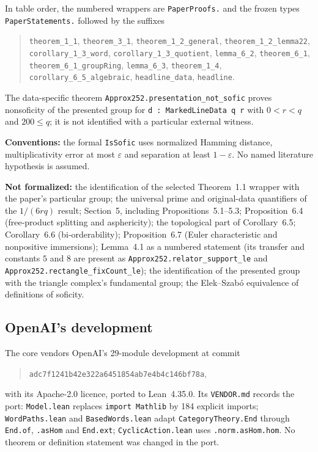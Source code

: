 \documentclass[11pt]{article}
\theoremstyle{definition}
\theoremstyle{remark}
\numberwithin{equation}{section}
\newcommand{\eps}{\varepsilon}
\newcommand{\lean}[1]{\nolinkurl{#1}}
\begin{document}
In table order, the numbered wrappers are \lean{PaperProofs.} and the frozen
types \lean{PaperStatements.} followed by the suffixes
\begin{quote}\small\raggedright
\lean{theorem_1_1}, \lean{theorem_3_1}, \lean{theorem_1_2_general},
\lean{theorem_1_2_lemma22}, \lean{corollary_1_3_word},
\lean{corollary_1_3_quotient}, \lean{lemma_6_2}, \lean{theorem_6_1},
\lean{theorem_6_1_groupRing}, \lean{lemma_6_3}, \lean{theorem_1_4},
\lean{corollary_6_5_algebraic}, \lean{headline_data}, \lean{headline}.
\end{quote}
The data-specific theorem \lean{Approx252.presentation_not_sofic} proves
nonsoficity of the presented group for \verb|d : MarkedLineData q r| with
$0<r<q$ and $200\le q$; it is not identified with a particular external
witness.

\noindent\textbf{Conventions:} the formal \lean{IsSofic} uses normalized
Hamming distance, multiplicativity error at most $\eps$ and separation at least
$1-\eps$. No named literature hypothesis is assumed.

\noindent\textbf{Not formalized:} the identification of the selected
Theorem~1.1 wrapper with the paper's particular group; the universal prime and
original-data quantifiers of the $1/(6rq)$ result; Section~5, including
Propositions~5.1--5.3; Proposition~6.4 (free-product splitting and
asphericity); the topological part of Corollary~6.5; Corollary~6.6
(bi-orderability); Proposition~6.7 (Euler characteristic and nonpositive
immersions); Lemma~4.1 as a numbered statement (its transfer and constants $5$
and $8$ are present as \lean{Approx252.relator_support_le} and
\lean{Approx252.rectangle_fixCount_le}); the identification of the presented
group with the triangle complex's fundamental group; the Elek--Szab\'o
equivalence of definitions of soficity.

\subsection*{OpenAI's development}
The core vendors OpenAI's 29-module development at commit
\begin{quote}\small\nolinkurl{adc7f1241b42e322a6451854ab7e4b4c146bf78a},\end{quote}
with its Apache-2.0 licence, ported to Lean~4.35.0. Its \lean{VENDOR.md}
records the port: \lean{Model.lean} replaces \verb|import Mathlib| by 184
explicit imports; \lean{WordPaths.lean} and \lean{BasedWords.lean} adapt
\lean{CategoryTheory.End} through \lean{End.of}, \lean{.asHom} and
\lean{End.ext}; \lean{CyclicAction.lean} uses \lean{.norm.asHom.hom}. No theorem
or definition statement was changed in the port.
\end{document}
